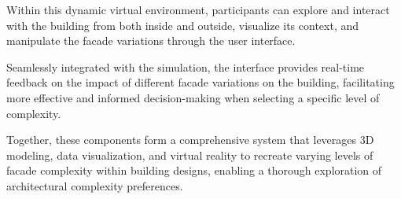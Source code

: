 Within this dynamic virtual environment, participants can explore and interact with the building from both inside and outside, visualize its context, and manipulate the facade variations through the user interface.

Seamlessly integrated with the simulation, the interface provides real-time feedback on the impact of different facade variations on the building, facilitating more effective and informed decision-making when selecting a specific level of complexity.

Together, these components form a comprehensive system that leverages 3D modeling, data visualization, and virtual reality to recreate varying levels of facade complexity within building designs, enabling a thorough exploration of architectural complexity preferences.